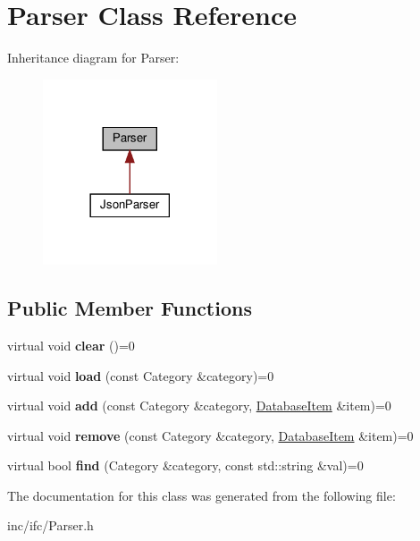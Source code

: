 \hypertarget{classParser}{}\section{Parser Class Reference}
\label{classParser}


Inheritance diagram for Parser\+:\nopagebreak
\begin{figure}[H]
\begin{center}
\leavevmode
\includegraphics[width=146pt]{classParser__inherit__graph}
\end{center}
\end{figure}
\subsection*{Public Member Functions}
\begin{DoxyCompactItemize}
\item 
\mbox{\label{classParser_a81703f49fece0260dc74bdc0ec2f2afe}} 
virtual void {\bfseries clear} ()=0
\item 
\mbox{\label{classParser_a0c7ff57756720984203d88cd98ae59b1}} 
virtual void {\bfseries load} (const Category \&category)=0
\item 
\mbox{\label{classParser_a370e612b404bf66118d23234cf294e39}} 
virtual void {\bfseries add} (const Category \&category, \hyperlink{classDatabaseItem}{Database\+Item} \&item)=0
\item 
\mbox{\label{classParser_aa10c06db53b068f2f14de7160d2be927}} 
virtual void {\bfseries remove} (const Category \&category, \hyperlink{classDatabaseItem}{Database\+Item} \&item)=0
\item 
\mbox{\label{classParser_a0fbcf702bd9426dcc15f15900ebb0afb}} 
virtual bool {\bfseries find} (Category \&category, const std\+::string \&val)=0
\end{DoxyCompactItemize}


The documentation for this class was generated from the following file\+:\begin{DoxyCompactItemize}
\item 
inc/ifc/Parser.\+h\end{DoxyCompactItemize}
